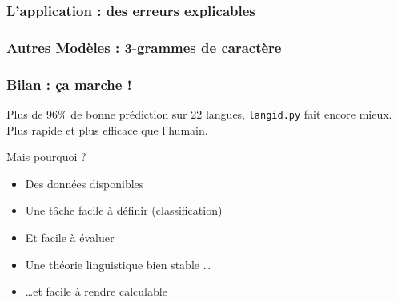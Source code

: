 \begin{frame}
\frametitle{L'application : des erreurs explicables}
\begin{small}

\end{small}

\end{frame}

\begin{frame}
\frametitle{Autres Modèles : 3-grammes de caractère}
\begin{small}

\end{small}
\end{frame}

\begin{frame}
  \frametitle{Bilan : ça marche !}

Plus de 96\% de bonne prédiction sur 22 langues, \texttt{langid.py} fait encore mieux. Plus rapide et plus efficace que l'humain.
\begin{block}{Mais pourquoi ?}

\pause

\begin{itemize}
  \item Des données disponibles
  \item Une tâche facile à définir (classification)
  \item Et facile à évaluer
  \pause
  \item Une théorie linguistique bien stable \dots
  \item \dots et facile à rendre calculable
\end{itemize}
\end{block}

\end{frame}

